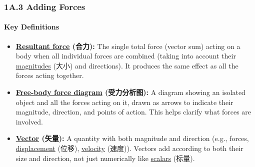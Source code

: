 
\subsubsection{1A.3 Adding Forces}
\paragraph{Key Definitions}
\begin{itemize}
    \item \textbf{\underline{Resultant force} (合力):} The single total force (vector sum) acting on a body when all individual
    forces are combined (taking into account their \underline{magnitudes} (大小) and directions). It produces the same effect as
    all the forces acting together.
    \item \textbf{\underline{Free-body force diagram} (受力分析图):} A diagram showing an isolated object and all the forces acting
    on it, drawn as arrows to indicate their magnitude, direction, and points of action. This helps clarify what forces are
    involved.
    \item \textbf{\underline{Vector} (矢量):} A quantity with both magnitude and direction (e.g., forces, \underline{displacement}
    (位移), \underline{velocity} (速度)). Vectors add according to both their size and direction, not just numerically like
    \underline{scalars} (标量).
\end{itemize}


